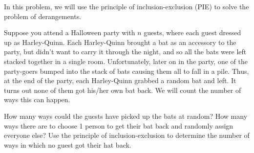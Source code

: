 \documentclass[12pt,twoside]{article}
\begin{document}
\begin{problem}{15}
In this problem, we will use the principle of inclusion-exclusion (PIE) to solve the problem of derangements.  

Suppose you attend a Halloween party with $n$ guests, where each guest dressed up as Harley-Quinn.  Each Harley-Quinn brought a bat as an accessory to the party, but didn't want to carry it through the night, and so all the bats were left stacked together in a single room.  Unfortunately, later on in the party, one of the party-goers bumped into the stack of bats causing them all to fall in a pile.  Thus, at the end of the party, each Harley-Quinn grabbed a random bat and left.  It turns out none of them got his/her own bat  back.  We will count the number of ways this can happen.

\bparts
{} How many ways could the guests have picked up the bats at random?
 How many ways there are to choose 1 person to get their bat back and randomly assign everyone else?
 Use the principle of inclusion-exclusion to determine the number of ways in which no guest got their hat back.
\eparts


\end{problem}
\end{document}
